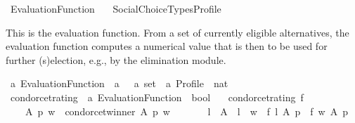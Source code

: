 %
\begin{isabellebody}%
%
%
\isadelimdocument
\isanewline
%
\endisadelimdocument
%
\isatagdocument
\isanewline
%
\isamarkuptrue%
%
\endisatagdocument
{\isafolddocument}%
%
\isadelimdocument
%
\endisadelimdocument
%
\isadelimtheory
%
\endisadelimtheory
%
\isatagtheory
{}\isamarkupfalse%
\ Evaluation{\isacharunderscore}{\kern0pt}Function\isanewline
\ \ \ {\isachardoublequoteopen}Social{\isacharunderscore}{\kern0pt}Choice{\isacharunderscore}{\kern0pt}Types{\isacharslash}{\kern0pt}Profile{\isachardoublequoteclose}\isanewline
{}%
\endisatagtheory
{\isafoldtheory}%
%
\isadelimtheory
%
\endisadelimtheory
%
\begin{isamarkuptext}%
This is the evaluation function. From a set of currently eligible alternatives,
the evaluation function computes a numerical value that is then to be used for
further (s)election, e.g., by the elimination module.%
\end{isamarkuptext}\isamarkuptrue%
%
\isadelimdocument
%
\endisadelimdocument
%
\isatagdocument
%
\isamarkuptrue%
%
\endisatagdocument
{\isafolddocument}%
%
\isadelimdocument
%
\endisadelimdocument
{}\isamarkupfalse%
\ {\isacharprime}{\kern0pt}a\ Evaluation{\isacharunderscore}{\kern0pt}Function\ {\isacharequal}{\kern0pt}\ {\isachardoublequoteopen}{\isacharprime}{\kern0pt}a\ \ {\isasymRightarrow}\ {\isacharprime}{\kern0pt}a\ set\ {\isasymRightarrow}\ {\isacharprime}{\kern0pt}a\ Profile\ {\isasymRightarrow}\ nat{\isachardoublequoteclose}%
\isadelimdocument
%
\endisadelimdocument
%
\isatagdocument
%
\isamarkuptrue%
%
\endisatagdocument
{\isafolddocument}%
%
\isadelimdocument
%
\endisadelimdocument
{}\isamarkupfalse%
\ condorcet{\isacharunderscore}{\kern0pt}rating\ {\isacharcolon}{\kern0pt}{\isacharcolon}{\kern0pt}\ {\isachardoublequoteopen}{\isacharprime}{\kern0pt}a\ Evaluation{\isacharunderscore}{\kern0pt}Function\ {\isasymRightarrow}\ bool{\isachardoublequoteclose}\ \isanewline
\ \ {\isachardoublequoteopen}condorcet{\isacharunderscore}{\kern0pt}rating\ f\ {\isasymequiv}\isanewline
\ \ \ \ {\isasymforall}A\ p\ w\ {\isachardot}{\kern0pt}\ condorcet{\isacharunderscore}{\kern0pt}winner\ A\ p\ w\ {\isasymlongrightarrow}\isanewline
\ \ \ \ \ \ {\isacharparenleft}{\kern0pt}{\isasymforall}l\ {\isasymin}\ A\ {\isachardot}{\kern0pt}\ l\ {\isasymnoteq}\ w\ {\isasymlongrightarrow}\ f\ l\ A\ p\ {\isacharless}{\kern0pt}\ f\ w\ A\ p{\isacharparenright}{\kern0pt}{\isachardoublequoteclose}%

\end{isabellebody}
